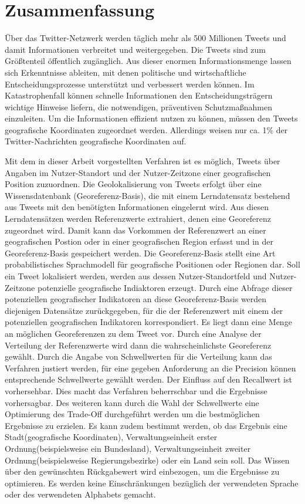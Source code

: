 \chapter{Zusammenfassung} 

	Über das Twitter-Netzwerk werden täglich mehr als 500 Millionen Tweets und damit Informationen verbreitet und weitergegeben. 
	Die Tweets sind zum Größtenteil öffentlich zugänglich. 
	Aus dieser enormen Informationsmenge lassen sich Erkenntnisse ableiten, mit denen politische und wirtschaftliche Entscheidungsprozesse unterstützt und verbessert werden können. 
	Im Katastrophenfall können schnelle Informationen den Entscheidungsträgern wichtige Hinweise liefern, die notwendigen, präventiven Schutzmaßnahmen einzuleiten.
	Um die Informationen effizient nutzen zu können, müssen den Tweets geografische Koordinaten zugeordnet werden.
	Allerdings weisen nur ca. 1\% der Twitter-Nachrichten geografische Koordinaten auf.

	Mit dem in dieser Arbeit vorgestellten Verfahren ist es möglich, Tweets über Angaben im Nutzer-Standort und der Nutzer-Zeitzone einer geografischen Position zuzuordnen.
	Die Geolokalisierung von Tweets erfolgt über eine Wissensdatenbank (Georeferenz-Basis), die mit einem Lerndatensatz bestehend aus Tweets mit den benötigten Informationen eingelernt wird. 
	Aus diesen Lerndatensätzen werden Referenzwerte extrahiert, denen eine Georeferenz zugeordnet wird.
	Damit kann das Vorkommen der Referenzwert an einer geografischen Postion oder in einer geografischen Region erfasst und in der Georeferenz-Basis gespeichert werden.
	Die Georeferenz-Basis stellt eine Art probabilistisches Sprachmodell für geografische Positionen oder Regionen dar.
	Soll ein Tweet lokalisiert werden, werden aus dessen Nutzer-Standortfeld und Nutzer-Zeitzone potenzielle geografische Indiaktoren erzeugt.
	Durch eine Abfrage dieser potenziellen geografischer Indikatoren an diese Georeferenz-Basis werden diejenigen Datensätze zurückgegeben, für die der Referenzwert mit einem der potenziellen geografischen Indikatoren korrespondiert.
	Es liegt dann eine Menge an möglichen Georeferenzen zu dem Tweet vor.
	Durch eine Analyse der Verteilung der Referenzwerte wird dann die wahrscheinlichste Georeferenz gewählt.
	Durch die Angabe von Schwellwerten für die Verteilung kann das Verfahren justiert werden, für eine gegeben Anforderung an die Precision können entsprechende Schwellwerte gewählt werden.
	Der Einfluss auf den Recallwert ist vorhersehbar.
	Dies macht das Verfahren beherrschbar und die Ergebnisse vorhersagbar.
	Des weiteren kann durch die Wahl der Schwellwerte eine Optimierung des Trade-Off durchgeführt werden um die bestmöglichen Ergebnisse zu erzielen.
	Es kann zudem bestimmt werden, ob das Ergebnis eine Stadt(geografische Koordinaten), Verwaltungseinheit erster Ordnung(beispielsweise ein Bundesland), Verwaltungseinheit zweiter Ordnung(beispielsweise Regierungsbezirke) oder ein Land sein soll. 
	Das Wissen über den gewünschten Rückgabewert wird einbezogen, um die Ergebnisse zu optimieren.
	Es werden keine Einschränkungen bezüglich der verwendeten Sprache oder des verwendeten Alphabets gemacht.
 	
